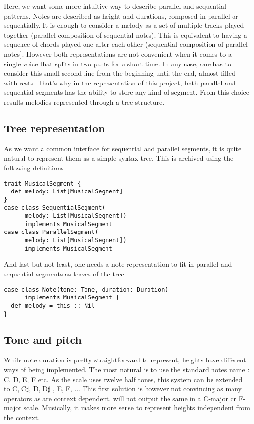 \documentclass[preprint]{sigplanconf}
\begin{document}
Here, we want some more intuitive way to describe parallel and sequential patterns. Notes are described as height and durations, composed in parallel or sequentially.
It is enough to consider a melody as a set of multiple tracks played together (parallel composition of sequential notes). This is equivalent to having a sequence of chords played one after each other (sequential composition of parallel notes). However both representations are not convenient when it comes to a single voice that splits in two parts for a short time. In any case, one has to consider this small second line from the beginning until the end, almost filled with rests.
That's why in the representation of this project, both parallel and sequential segments has the ability to store any kind of segment. From this choice results melodies represented through a tree structure.


\subsection{Tree representation}
As we want a common interface for sequential and parallel segments, it is quite natural to represent them as a simple syntax tree. This is archived using the following definitions.
\begin{lstlisting}
trait MusicalSegment {
  def melody: List[MusicalSegment]
}
case class SequentialSegment(
      melody: List[MusicalSegment])
      implements MusicalSegment
case class ParallelSegment(
      melody: List[MusicalSegment])
      implements MusicalSegment
\end{lstlisting}
And last but not least, one needs a note representation to fit in parallel and sequential segments as leaves of the tree :

\begin{lstlisting}
case class Note(tone: Tone, duration: Duration)
      implements MusicalSegment {
  def melody = this :: Nil
}
\end{lstlisting}



\subsection{Tone and pitch}

While note duration is pretty straightforward to represent, heights have different ways of being implemented.
The most natural is to use the standard notes name : C, D, E, F etc. As the scale uses twelve half tones, this system can be extended to C, C$\sharp$, D, D$\sharp$ , E, F, ... This first solution is however not convincing as many operators as  are context dependent.  will not output the same in a C-major or F-major scale. Musically, it makes more sense to represent heights independent from the context.
\end{document}
